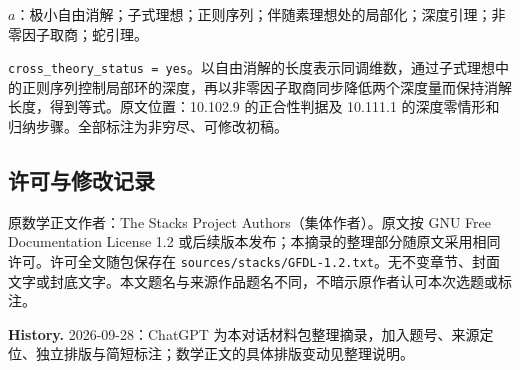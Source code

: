 \documentclass[UTF8,11pt]{ctexart}
\begin{document}
$a$：极小自由消解；子式理想；正则序列；伴随素理想处的局部化；深度引理；非零因子取商；蛇引理。

\texttt{cross\_theory\_status = yes}。以自由消解的长度表示同调维数，通过子式理想中的正则序列控制局部环的深度，再以非零因子取商同步降低两个深度量而保持消解长度，得到等式。原文位置：10.102.9 的正合性判据及 10.111.1 的深度零情形和归纳步骤。全部标注为非穷尽、可修改初稿。
\subsection*{许可与修改记录}
原数学正文作者：The Stacks Project Authors（集体作者）。原文按 GNU Free Documentation License 1.2 或后续版本发布；本摘录的整理部分随原文采用相同许可。许可全文随包保存在 \texttt{sources/stacks/GFDL-1.2.txt}。无不变章节、封面文字或封底文字。本文题名与来源作品题名不同，不暗示原作者认可本次选题或标注。

\textbf{History.} 2026-09-28：ChatGPT 为本对话材料包整理摘录，加入题号、来源定位、独立排版与简短标注；数学正文的具体排版变动见整理说明。
\end{document}
